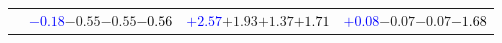 \documentclass[compress]{beamer}
\begin{document}
\begin{frame}
\begin{tabular}{r | c | c | c}
          & \textcolor{blue}{$-0.18$}\hspace{0.1 cm}$-0.55$\hspace{0.1 cm}$-0.55$\hspace{0.1 cm}\textcolor{black}{$-0.56$} & \textcolor{blue}{$+2.57$}\hspace{0.1 cm}$+1.93$\hspace{0.1 cm}$+1.37$\hspace{0.1 cm}\textcolor{black}{$+1.71$} & \textcolor{blue}{$+0.08$}\hspace{0.1 cm}$-0.07$\hspace{0.1 cm}$-0.07$\hspace{0.1 cm}\textcolor{black}{$-1.68$} \\
\end{tabular}
\end{frame}
\end{document}
